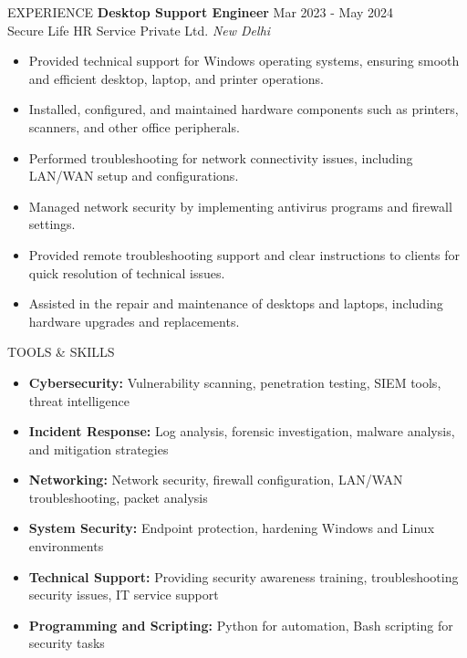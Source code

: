 \documentclass{resume} %
\begin{document}
\begin{rSection}{EXPERIENCE}
\vspace{6mm}
\textbf{Desktop Support Engineer} \hfill Mar 2023 - May 2024\\
Secure Life HR Service Private Ltd. \hfill \textit{New Delhi}
 \begin{itemize}
    \itemsep -3pt {} 
     \item Provided technical support for Windows operating systems, ensuring smooth and efficient desktop, laptop, and printer operations.
     \item Installed, configured, and maintained hardware components such as printers, scanners, and other office peripherals.
     \item Performed troubleshooting for network connectivity issues, including LAN/WAN setup and configurations.
     \item Managed network security by implementing antivirus programs and firewall settings.
     \item Provided remote troubleshooting support and clear instructions to clients for quick resolution of technical issues.
     \item Assisted in the repair and maintenance of desktops and laptops, including hardware upgrades and replacements.
 \end{itemize}

\end{rSection}

\begin{rSection}{TOOLS \& SKILLS}
\begin{itemize}
    \item \textbf{Cybersecurity:} Vulnerability scanning, penetration testing, SIEM tools, threat intelligence
    \item \textbf{Incident Response:} Log analysis, forensic investigation, malware analysis, and mitigation strategies
    \item \textbf{Networking:} Network security, firewall configuration, LAN/WAN troubleshooting, packet analysis
    \item \textbf{System Security:} Endpoint protection, hardening Windows and Linux environments
    \item \textbf{Technical Support:} Providing security awareness training, troubleshooting security issues, IT service support
    \item \textbf{Programming and Scripting:} Python for automation, Bash scripting for security tasks
\end{itemize}
\end{rSection}
\end{document}
